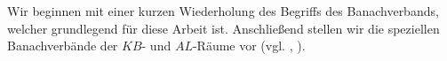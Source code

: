 






Wir beginnen mit einer kurzen Wiederholung des Begriffs des Banachverbands, welcher grundlegend für diese Arbeit ist.  Anschließend stellen wir die speziellen Banachverbände der $KB$- und $AL$-Räume vor (vgl. \cite{aliprantis_burkinshaw_2006}, \cite{banasiak_arlotti_2006}). 


